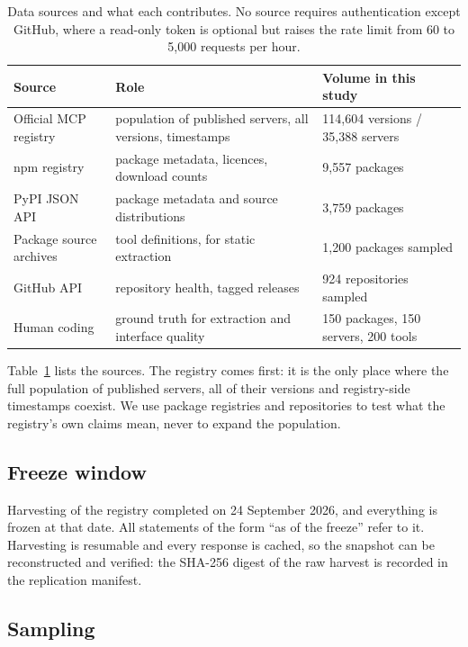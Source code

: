 \documentclass[a4paper,fleqn]{cas-dc}
\begin{document}
\begin{table}[t]
\caption{Data sources and what each contributes. No source requires
authentication except GitHub, where a read-only token is optional but raises
the rate limit from 60 to 5,000 requests per hour.}
\label{tab:sources}
\centering
\begin{tabular}{@{}lll@{}}
\toprule
Source & Role & Volume in this study \\
\midrule
Official MCP registry & population of published servers, all versions, timestamps & 114,604 versions / 35,388 servers \\
npm registry & package metadata, licences, download counts & 9,557 packages \\
PyPI JSON API & package metadata and source distributions & 3,759 packages \\
Package source archives & tool definitions, for static extraction & 1,200 packages sampled \\
GitHub API & repository health, tagged releases & 924 repositories sampled \\
Human coding & ground truth for extraction and interface quality & 150 packages, 150 servers, 200 tools \\
\bottomrule
\end{tabular}
\end{table}

Table~\ref{tab:sources} lists the sources. The registry comes first: it is the
only place where the full population of published servers, all of their
versions and registry-side timestamps coexist. We use package registries and
repositories to test what the registry's own claims mean, never to expand the
population.

\subsection{Freeze window}

Harvesting of the registry completed on 24 September 2026, and everything is
frozen at that date. All statements of the form ``as of the freeze'' refer to
it. Harvesting is resumable and every response is cached, so the snapshot can
be reconstructed and verified: the SHA-256 digest of the raw harvest is
recorded in the replication manifest.

\subsection{Sampling}
\end{document}
